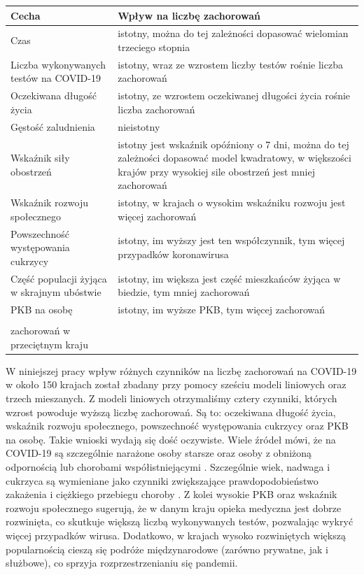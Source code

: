 \documentclass[12pt]{mwbk}
\theoremstyle{plain}
\theoremstyle{definition}
\theoremstyle{definition}
\newcommand\zrodlo[1]{\par\vspace{-3mm}{\small\textit{Źródło: }#1 }}
\begin{document}
\begin{longtable}{| p{} | p{} |}
	\hline
	Cecha & Wpływ na liczbę zachorowań \\ \hline \hline 
	Czas & istotny, można do tej zależności dopasować wielomian trzeciego stopnia \\ \hline
	Liczba wykonywanych testów na COVID-19 & istotny, wraz ze wzrostem liczby testów rośnie liczba zachorowań \\ \hline
	Oczekiwana długość życia & istotny, ze wzrostem oczekiwanej długości życia rośnie liczba zachorowań \\ \hline 
	Gęstość zaludnienia & nieistotny \\ \hline
	Wskaźnik siły obostrzeń & istotny jest wskaźnik opóźniony o 7 dni, można do tej zależności dopasować model kwadratowy, w większości krajów przy wysokiej sile obostrzeń jest mniej zachorowań \\ \hline
	Wskaźnik rozwoju społecznego & istotny, w krajach o wysokim wskaźniku rozwoju jest więcej zachorowań \\ \hline
	Powszechność występowania cukrzycy & istotny, im wyższy jest ten współczynnik, tym więcej przypadków koronawirusa \\ \hline
	Część populacji żyjąca w skrajnym ubóstwie & istotny, im większa jest część mieszkańców żyjąca w biedzie, tym mniej zachorowań \\ \hline
	PKB na osobę & istotny, im wyższe PKB, tym więcej zachorowań \\ \hline
	\caption{Porównanie istotności i wpływu różnych czynników na liczbę \\zachorowań w przeciętnym kraju}
	
	\label{tab:istotnosc}
	
	\end{longtable}
\begin{center}\zrodlo{Opracowanie własne}
	\end{center}


W niniejszej pracy wpływ różnych czynników na liczbę zachorowań na COVID-19 w około 150 krajach został zbadany przy pomocy sześciu modeli liniowych oraz trzech mieszanych. Z modeli liniowych otrzymaliśmy cztery czynniki, których wzrost powoduje wyższą liczbę zachorowań. Są to: oczekiwana długość życia, wskaźnik rozwoju społecznego, powszechność występowania cukrzycy oraz PKB na osobę. Takie wnioski wydają się dość oczywiste. Wiele źródeł mówi, że na COVID-19 są szczególnie narażone osoby starsze oraz osoby z obniżoną odpornością lub chorobami współistniejącymi \cite{narazenie}. Szczególnie wiek, nadwaga i cukrzyca są wymieniane jako czynniki zwiększające prawdopodobieństwo zakażenia i ciężkiego przebiegu choroby \cite{covid-19}. Z kolei wysokie PKB oraz wskaźnik rozwoju społecznego sugerują, że w danym kraju opieka medyczna jest dobrze rozwinięta, co skutkuje większą liczbą wykonywanych testów, pozwalając wykryć więcej przypadków wirusa. Dodatkowo, w krajach wysoko rozwiniętych większą popularnością cieszą się podróże międzynarodowe (zarówno prywatne, jak i służbowe), co sprzyja rozprzestrzenianiu się pandemii.
\end{document}
